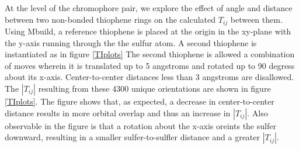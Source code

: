 At the level of the chromophore pair, we explore the effect of angle and distance between two non-bonded
thiophene rings on the calculated $T_{ij}$ between them.
Using Mbuild, a reference thiophene is placed at the origin in the xy-plane
with the y-axis running through the the sulfur atom. 
A second thiophene is instantiated as in figure \ref{TIplots}
The second thiophene is allowed a combination of moves wherein it is translated up to 5 angstroms 
and rotated up to 90 degress about its x-axis. Center-to-center distances less than 3 angstroms are disallowed. 
The $|T_{ij}|$ resulting from these 4300 unique orientations are shown in figure \ref{TIplots}. The figure shows that, as expected, a
decrease in 
center-to-center distance results in more orbital overlap and thus an increase in $|T_{ij}|$. Also observable in the figure is that
a rotation about the x-axis oreints the sulfer downward, resulting in a smaller sulfer-to-sulfler distance 
and a greater $|T_{ij}|$. 

